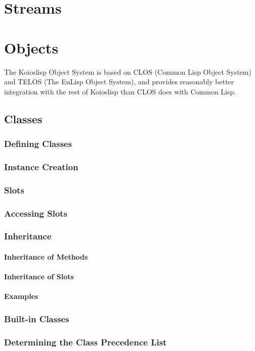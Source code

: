 \documentclass[10pt]{book}
\begin{document}
\chapter{Streams}
\chapter{Objects}
The Koioslisp Object System is based on CLOS (Common Lisp Object System) and TELOS (The EuLisp Object System), and provides reasonably better integration with the rest of Koioslisp than CLOS does with Common Lisp.
\section{Classes}
\subsection{Defining Classes}
\subsection{Instance Creation}
\subsection{Slots}
\subsection{Accessing Slots}
\subsection{Inheritance}
\subsubsection{Inheritance of Methods}
\subsubsection{Inheritance of Slots}
\subsubsection{Examples}
\subsection{Built-in Classes}
\subsection{Determining the Class Precedence List}
\end{document}
